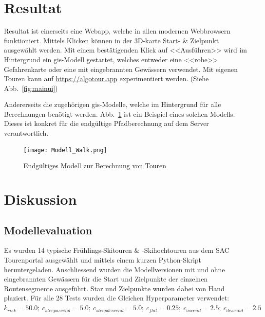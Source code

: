 \section{Resultat}

Resultat ist einerseits eine Webapp, welche in allen modernen Webbrowsern funktioniert. Mittels Klicken können in der 3D-karte Start- \& Zielpunkt ausgewählt werden. Mit einem bestätigenden Klick auf <<Ausführen>> wird im Hintergrund ein \gls{gis}-Modell gestartet, welches entweder eine <<rohe>> Gefahrenkarte oder eine mit eingebrannten Gewässern verwendet. Mit eigenen Touren kann auf \url{https://algotour.app} experimentiert werden. (Siehe Abb.\ \ref{fig:mainui})

Andererseits die zugehörigen \gls{gis}-Modelle, welche im Hintergrund für alle Berechnungen benötigt werden. Abb.\ \ref{fig:walkmodel} ist ein Beispiel eines solchen Modells. Dieses ist konkret für die endgültige Pfadberechnung auf dem Server verantwortlich.


\begin{figure}[H]
  \centering
  \texttt{[image: Modell\_Walk.png]}
  \caption{Endgültiges Modell zur Berechnung von Touren}\label{fig:walkmodel}
\end{figure}

\clearpage
\section{Diskussion}

\subsection{Modellevaluation}

Es wurden 14 typische Frühlings-Skitouren \& -Skihochtouren aus dem SAC Tourenportal ausgewählt und mittels einem kurzen Python-Skript heruntergeladen. Anschliessend wurden die Modellversionen mit und ohne eingebrannten Gewässern für die Start und Zielpunkte der einzelnen Routensegmente ausgeführt. Star und Zielpunkte wurden dabei von Hand plaziert. Für alle 28 Tests wurden die Gleichen Hyperparameter verwendet: $k_{risk}={50.0};\ c_{steepascend}={5.0};\ c_{steepdescend}={5.0};\ c_{flat}={0.25};\ c_{ascend}={2.5};\ c_{descend}={2.5}$

